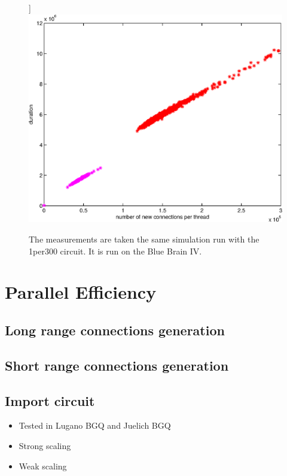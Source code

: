 \begin{figure}[ht!]
\begin{center}
        			]{%
           \label{detailnewcon:second}
           \includegraphics[scale=0.41]{pictures/t8_duration_per_con_1_300.eps}
		}
    \end{center}
    \caption{%
        The measurements are taken the same simulation run with the 1per300 circuit. It is run on the Blue Brain IV.
     }%
   \label{detailnewcon}
\end{figure}



\newpage
\section{Parallel Efficiency}

\subsection{Long range connections generation}
\subsection{Short range connections generation}
\subsection{Import circuit}

\begin{itemize}
      \item Tested in Lugano BGQ and Juelich BGQ
      \item Strong scaling
      \item Weak scaling
\end{itemize}

